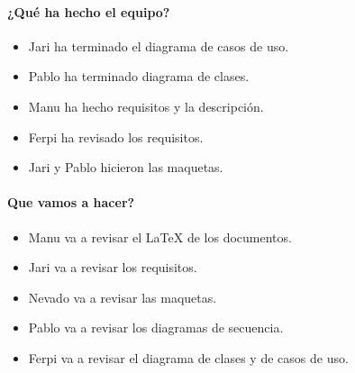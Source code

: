 \documentclass[a4paper, 12pt, spanish]{memoria}
\begin{document}
\paragraph{¿Qué ha hecho el equipo?}
\begin{itemize}
  \item Jari ha terminado el diagrama de casos de uso.
  \item Pablo ha terminado diagrama de clases.
  \item Manu ha hecho requisitos y la descripción.
  \item Ferpi ha revisado los requisitos.
  \item Jari y Pablo hicieron las maquetas.
\end{itemize}

\paragraph{Que vamos a hacer?}
\begin{itemize}
        \item Manu va a revisar el \LaTeX{} de los documentos.
        \item Jari va a revisar los requisitos.
        \item Nevado va a revisar las maquetas.
        \item Pablo va a revisar los diagramas de secuencia. 
        \item Ferpi va a revisar el diagrama de clases y de casos de uso.
\end{itemize}
\end{document}
